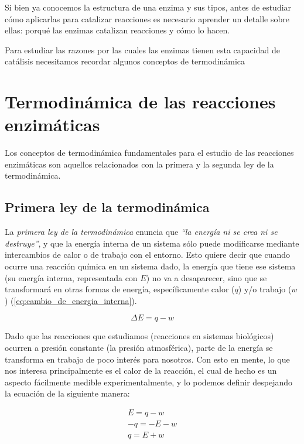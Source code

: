 
Si bien ya conocemos la estructura de una enzima y sus tipos, antes de estudiar cómo aplicarlas para catalizar reacciones es necesario aprender un detalle sobre ellas: porqué las enzimas catalizan reacciones y cómo lo hacen.

Para estudiar las razones por las cuales las enzimas tienen esta capacidad de catálisis necesitamos recordar algunos conceptos de termodinámica

\section{Termodinámica de las reacciones enzimáticas}

Los conceptos de termodinámica fundamentales para el estudio de las reacciones enzimáticas son aquellos relacionados con la primera y la segunda ley de la termodinámica. 

\subsection{Primera ley de la termodinámica}

La \emph{primera ley de la termodinámica} enuncia que \textit{``la energía ni se crea ni se destruye''}, y que la energía interna de un sistema sólo puede modificarse mediante intercambios de calor o de trabajo con el entorno.\citep{mathewsBioquimica2002,devlinBioquimica2014} Esto quiere decir que cuando ocurre una reacción química en un sistema dado, la energía que tiene ese sistema (su energía interna, representada con $E$) no va a desaparecer, sino que se transformará en otras formas de energía, específicamente calor ($q$) y/o trabajo ($w$) (\autoref{eq:cambio_de_energia_interna}).

\begin{equation}\label{eq:cambio_de_energia_interna}
    \Delta E = q - w
\end{equation}

Dado que las reacciones que estudiamos (reacciones en sistemas biológicos) ocurren a presión constante (la presión atmosférica), parte de la energía se transforma en trabajo de poco interés para nosotros. Con esto en mente, lo que nos interesa principalmente es el calor de la reacción, el cual de hecho es un aspecto fácilmente medible experimentalmente, y lo podemos definir despejando la ecuación de la siguiente manera: 

\begin{align*}
    E = q - w
    \\
    -q = -E - w
    \\
    q = E + w
\end{align*}

